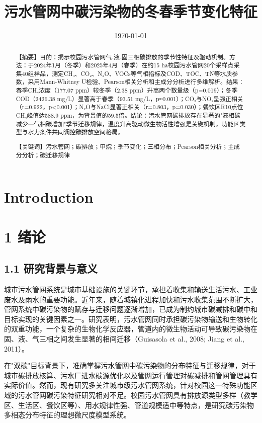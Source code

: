 \documentclass[12pt]{article}
\title{污水管网中碳污染物的冬春季节变化特征}
\date{\today}
\begin{document}
\maketitle

\begin{abstract}
【摘要】目的：揭示校园污水管网气-液-固三相碳排放的季节性特征及驱动机制。方法：于2024年1月（冬季）和2025年4月（春季）在约15 ha校园污水管网20个采样点采集40组样品，测定CH₄、CO₂、N₂O、VOCs等气相指标及COD、TOC、TN等水质参数，采用Mann-Whitney U检验、Pearson相关分析和主成分分析进行多维解析。结果：春季CH₄浓度（177.07 ppm）较冬季（2.38 ppm）升高两个数量级（p=0.019）；冬季COD（2426.38 mg/L）显著高于春季（93.51 mg/L，p≈0.001）；CO₂与NO₂呈强正相关（r=0.922，p<0.001）；N₂O与NaCl显著正相关（r=0.803，p=0.030）；餐饮区R10点位CH₄峰值达588.9 ppm，为背景值的59.5倍。结论：污水管网碳排放存在显著的"液相碳减少—气相碳增加"季节迁移规律，温度升高驱动微生物活性增强是关键机制，功能区类型与水力条件共同调控碳排放空间格局。

【关键词】污水管网；碳排放；甲烷；季节变化；三相分布；Pearson相关分析；主成分分析；碳迁移规律
\end{abstract}

\section{Introduction}
\label{sec:introduction}

\section{1 绪论}

\subsection{1.1 研究背景与意义}

城市污水管网系统是城市基础设施的关键环节，承担着收集和输送生活污水、工业废水及雨水的重要功能。近年来，随着城镇化进程加快和污水收集范围不断扩大，管网系统中碳污染物的赋存与迁移问题逐渐增加，已成为制约城市碳减排和碳中和目标实现的关键因素之一。研究表明，污水管网同时承担碳污染物输送和生物转化的双重功能，一个复杂的生物化学反应器，管道内的微生物活动可导致碳污染物在固、液、气三相之间发生显著的相间迁移（Guisasola et al., 2008; Jiang et al., 2011）。

在"双碳"目标背景下，准确掌握污水管网中碳污染物的分布特征与迁移规律，对于城市碳排放核算、污水厂进水碳源优化以及管网运行管理对碳减排和管网管理具有实际价值。然而，现有研究多关注城市级污水管网系统，针对校园这一特殊功能区域的污水管网碳污染特征研究相对不足。校园污水管网具有排放源类型多样（教学区、生活区、餐饮区等）、用水规律性强、管道规模适中等特点，是研究碳污染物多相态分布特征的理想微尺度模型系统。
\end{document}
